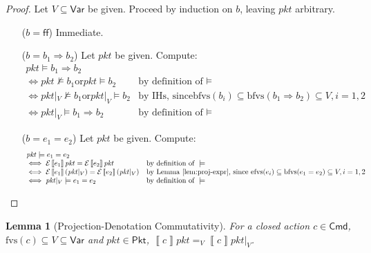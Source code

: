 \documentclass{article}
\newcommand{\pkt}{\mathit{pkt}}
\newcommand{\denote}[1]{\left\llbracket#1\right\rrbracket}
\newcommand{\edenote}[1]{\mathcal{E}\denote{#1}}
\newcommand{\FALSE}{\mathsf{ff}}
\newcommand{\Cmd}{\mathsf{Cmd}}
\newcommand{\Pkt}{\mathsf{Pkt}}
\newcommand{\Var}{\mathsf{Var}}
\newcommand{\fvs}{\textrm{fvs}}
\newcommand{\efvs}{\textrm{efvs}}
\newcommand{\bfvs}{\textrm{bfvs}}
\newtheorem{lemma}{Lemma}
\begin{document}
\begin{proof}
  Let $V \subseteq \Var$ be given.
  Proceed by induction on $b$, leaving $\pkt$ arbitrary.
  \begin{enumerate}[align=left]
  \item[($b = \FALSE$)] Immediate.
  \item[($b = b_1 \Rightarrow b_2$)]
    Let $\pkt$ be given. Compute:
    \[\begin{array}{ll}
    \pkt \models b_1 \Rightarrow b_2 \\
    \iff \pkt \not\models b_1 \text{or} \pkt\models b_2 & \text{by definition of } \models   \\
    \iff \pkt|_V \not\models b_1 \text{or} \pkt|_V \models b_2  & \text{by IHs, since} \bfvs(b_i) \subseteq \bfvs(b_1 \Rightarrow b_2) \subseteq V, i = 1,2  \\
    \iff \pkt|_V \models b_1 \Rightarrow b_2
    & \text{by definition of } \models
    \end{array}\]

  \item[($b = e_1 = e_2$)] Let $\pkt$ be given. Compute:
    \[\begin{array}{ll}
    \pkt \models e_1 = e_2 \\
    \iff \edenote{e_1}\pkt = \edenote{e_2}\pkt
    & \text{by definition of }\models \\
    \iff \edenote{e_1}(\pkt|_V) = \edenote{e_2}(\pkt|_V)
    & \text{by Lemma~\ref{lem:proj-expr}, since } \efvs(e_i) \subseteq \bfvs(e_1 = e_2) \subseteq V, i = 1,2 \\
    \iff \pkt|_V \models e_1 = e_2
    & \text{by definition of }\models
    \end{array}\]

  \end{enumerate}

\end{proof}


\begin{lemma}[Projection-Denotation Commutativity]
  \label{lem:proj-den-comm}
  For a closed action $c \in \Cmd$, $\fvs(c) \subseteq V \subseteq \Var$ and
  $\pkt \in \Pkt$, $\denote{c} \pkt =_V \denote{c} \pkt|_V$.
\end{lemma}
\end{document}
